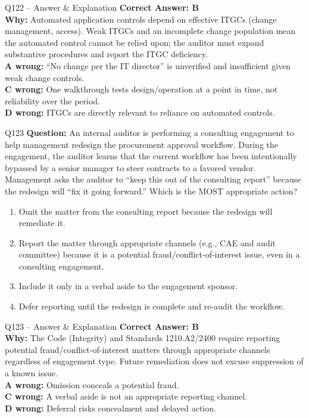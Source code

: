 \documentclass[aspectratio=169,10pt]{beamer}
\begin{document}
	\begin{frame}[t]{Q122 -- Answer \& Explanation}
		\small
		\textbf{Correct Answer: B} \\[4pt]
		\textbf{Why:} Automated application controls depend on effective ITGCs (change management, access). Weak ITGCs and an incomplete change population mean the automated control cannot be relied upon; the auditor must expand substantive procedures and report the ITGC deficiency. \\[4pt]
		\textbf{A wrong:} ``No change per the IT director'' is unverified and insufficient given weak change controls. \\[2pt]
		\textbf{C wrong:} One walkthrough tests design/operation at a point in time, not reliability over the period. \\[2pt]
		\textbf{D wrong:} ITGCs are directly relevant to reliance on automated controls.
	\end{frame}
	
	\begin{frame}[t]{Q123}
		\small
		\textbf{Question:} An internal auditor is performing a consulting engagement to help management redesign the procurement approval workflow. During the engagement, the auditor learns that the current workflow has been intentionally bypassed by a senior manager to steer contracts to a favored vendor. Management asks the auditor to ``keep this out of the consulting report'' because the redesign will ``fix it going forward.'' Which is the MOST appropriate action?
		\begin{enumerate}[label=\Alph*.,itemsep=1pt,topsep=2pt]
			\item Omit the matter from the consulting report because the redesign will remediate it.
			\item Report the matter through appropriate channels (e.g., CAE and audit committee) because it is a potential fraud/conflict-of-interest issue, even in a consulting engagement.
			\item Include it only in a verbal aside to the engagement sponsor.
			\item Defer reporting until the redesign is complete and re-audit the workflow.
		\end{enumerate}
	\end{frame}
	
	\begin{frame}[t]{Q123 -- Answer \& Explanation}
		\small
		\textbf{Correct Answer: B} \\[4pt]
		\textbf{Why:} The Code (Integrity) and Standards 1210.A2/2400 require reporting potential fraud/conflict-of-interest matters through appropriate channels regardless of engagement type. Future remediation does not excuse suppression of a known issue. \\[4pt]
		\textbf{A wrong:} Omission conceals a potential fraud. \\[2pt]
		\textbf{C wrong:} A verbal aside is not an appropriate reporting channel. \\[2pt]
		\textbf{D wrong:} Deferral risks concealment and delayed action.
	\end{frame}
	
\end{document}
